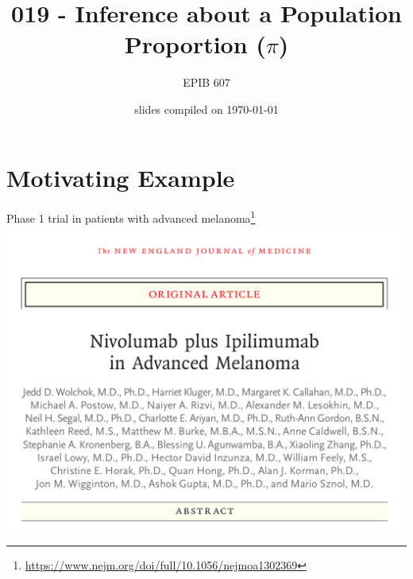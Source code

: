\documentclass[10pt,handout]{beamer}\usepackage[]{graphicx}\usepackage[]{color}
\begin{document}
	
	
	

	
\title{019 - Inference about a Population Proportion ($\pi$)}
\author{EPIB 607}

\date{slides compiled on \today}

\maketitle


\section{Motivating Example}

\begin{frame}{Phase 1 trial in patients with advanced melanoma\footnote{\tiny \url{https://www.nejm.org/doi/full/10.1056/nejmoa1302369}}}
	\centering
\includegraphics[scale=0.25]{wolchok.png}
\end{frame}
\end{document}
